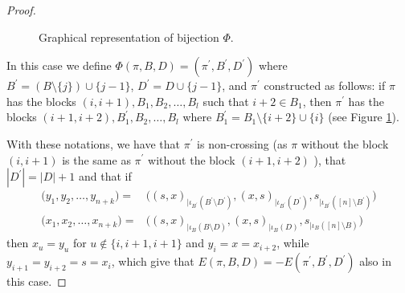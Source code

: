 \documentclass{amsart}
\begin{document}
\begin{proof}
\begin{center}
\begin{figure}[H]
  \caption{Graphical representation of bijection $\Phi$.}
  \label{fig:5}
  \end{figure}
\end{center}
  In this case we define 
  $ \Phi(\pi, B, D) = (\pi^\prime, B^\prime, D^\prime)$ 
  where
  $ B^\prime = (B \setminus \{j \}) \cup \{ j-1\} $,
  $ D^\prime = D \cup\{j-1\}$, and 
  $ \pi^\prime $ constructed as follows: if $ \pi $ has the blocks $(i, i+1), B_1, B_2, \dots, B_l $  such that 
 $ i+ 2 \in B_1 $, then 
 $\pi^\prime $ has the blocks $ (i+1, i+2), B_1^\prime , B_2, \dots, B_l $ where
 $ B_1^\prime = B_1 \setminus \{ i+2\} \cup \{i\} $ (see Figure \ref{fig:5}).
 
  With these notations, we have that $ \pi^\prime $ is non-crossing (as $ \pi $ without the block $ (i, i+1)$ is the same as $ \pi^\prime$ without the block $ (i+1, i+2)$ ), that $| D^\prime | = | D | + 1 $ and that if 
     \begin{align*}
  \big( y_1, y_2, \dots, y_{n+k}\big)
  = & \big(
  (s, x)_{|\iota_{B^\prime}(B^\prime \setminus D^\prime)},
  (x, s)_{| \iota_{B^\prime}(D^\prime)}, s_{|\iota_{B^\prime} ([n]\setminus B^\prime)}
  \big)\\
  \big( x_1, x_2, \dots, x_{n+k}\big)
  = & \big(
  (s, x)_{|\iota_{B}(B \setminus D)},
  (x, s)_{| \iota_{B}(D)}, s_{|\iota_{B} ([n]\setminus B)}
  \big)
  \end{align*} 
  then $ x_u = y_u $ for 
  $ u \notin\{i, i+1, i+1\} $ 
  and
   $ y_{i}= x = x_{i+2} $,
    while
   $ y_{i+1}=y_{i+2}= s = x_i$, 
   which give that 
  $ E (\pi, B, D) = - E(\pi^\prime, B^\prime, D^\prime)$
  also in this case.
\end{proof} 	
 
\end{document}
